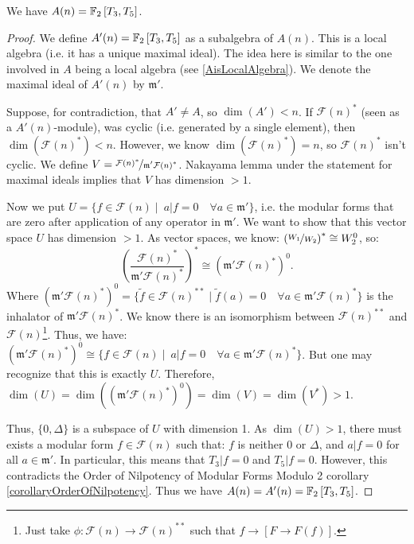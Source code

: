 \begin{property}
	We have $A(n) = \mathbb{F}_2 \left[ T_3, T_5 \right]$.
\end{property}
\begin{proof}
	We define $A'(n) = \mathbb{F}_2 \left[ T_3, T_5 \right]$ as a subalgebra of $A(n)$.
	This is a local algebra (i.e. it has a unique maximal ideal).
	The idea here is similar to the one involved in $A$ being a local algebra (see \ref{AisLocalAlgebra}).
	We denote the maximal ideal of $A'(n)$ by $\mathfrak{m}'$.
	
	Suppose, for contradiction, that $A' \neq A$, so $\dim(A') < n$.
	If $\mathcal{F}(n)^*$ (seen as a $A'(n)$-module), was cyclic (i.e. generated by a single element), then $\dim(\mathcal{F}(n)^*) < n$.
	However, we know $\dim(\mathcal{F}(n)^*)=n$, so $\mathcal{F}(n)^*$ isn't cyclic.
	We define $V=\nicefrac{\mathcal{F}(n)^*}{\mathfrak{m}'\mathcal{F}(n)^*}$.
	Nakayama lemma under the statement for maximal ideals implies that $V$ has dimension $>1$.
	
	
	Now we put $U = \{ f\in \mathcal{F}(n) \mid \ a|f=0 \quad \forall a \in \mathfrak{m}' \}$, i.e. the modular forms that are zero after application of any operator in $\mathfrak{m}'$.
	We want to show that this vector space $U$ has dimension $>1$.
	As vector spaces, we know: $\left( \nicefrac{W_1}{W_2} \right)^* \cong W_2^0$, so:
	$$
	\left( \frac{\mathcal{F}(n)^*}{\mathfrak{m}'\mathcal{F}(n)^*} \right)^* \cong \left( \mathfrak{m}'\mathcal{F}(n)^* \right)^0.
	$$
	Where 
	$
	\left( \mathfrak{m}'\mathcal{F}(n)^* \right)^0 = \{ \tilde{f} \in \mathcal{F}(n)^{**} \mid \tilde{f}(a)=0 \quad \forall a \in \mathfrak{m}'\mathcal{F}(n)^* \}
	$
	is the inhalator of $\mathfrak{m}'\mathcal{F}(n)^*$.
	We know there is an isomorphism between $\mathcal{F}(n)^{**}$ and $\mathcal{F}(n)$\footnote{Just take $\phi: \mathcal{F}(n) \to \mathcal{F}(n)^{**}$ such that $f \to \left[ F \to F(f) \right]$.}.
	Thus, we have:
	$
	\left( \mathfrak{m}'\mathcal{F}(n)^* \right)^0 \cong \{ f \in \mathcal{F}(n) \mid \ a|f=0 \quad \forall a \in \mathfrak{m}'\mathcal{F}(n)^* \}
	$.
	But one may recognize that this is exactly $U$.
	Therefore, 
	$\dim(U) 
	= \dim(\left( \mathfrak{m}'\mathcal{F}(n)^* \right)^0)
	= \dim(V) = \dim(V^*) > 1.
	$
	
	Thus, $\{ 0, \Delta \}$ is a subspace of $U$ with dimension 1.
	As $\dim(U)>1$, there must exists a modular form $f \in \mathcal{F}(n)$ such that:
	$f$ is neither $0$ or $\Delta$, and $a|f=0$ for all $a \in \mathfrak{m}'$.
	In particular, this means that $T_3|f=0$ and $T_5|f=0$.
	However, this contradicts the Order of Nilpotency of Modular Forms Modulo 2 corollary \ref{corollaryOrderOfNilpotency}.
	Thus we have $A(n) = A'(n) = \mathbb{F}_2 \left[ T_3, T_5 \right]$.
\end{proof}

